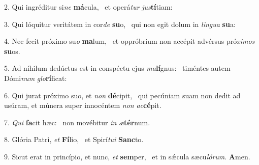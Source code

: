 2. Qui ingréditur si\textit{ne} \textbf{má}cula, \ast\  et operá\textit{tur} \textit{jus}\textbf{tí}tiam:\

3. Qui lóquitur veritátem in cor\textit{de} \textbf{su}o, \ast\  qui non egit dolum in \textit{lin}\textit{gua} \textbf{su}a:\

4. Nec fecit próximo su\textit{o} \textbf{ma}lum, \ast\  et oppróbrium non accépit advérsus pró\textit{xi}\textit{mos} \textbf{su}os.\

5. Ad níhilum dedúctus est in conspéctu ejus \textit{ma}\textbf{lí}gnus: \ast\  timéntes autem Dómi\textit{num} \textit{glo}\textbf{rí}ficat:\

6. Qui jurat próximo suo, et \textit{non} \textbf{dé}cipit, \ast\  qui pecúniam suam non dedit ad usúram, et múnera super innocéntem \textit{non} \textit{ac}\textbf{cé}pit.\

7. \textit{Qui} \textbf{fa}cit hæc: \ast\  non movébitur \textit{in} \textit{æ}\textbf{tér}num.\

8. Glória Patri, \textit{et} \textbf{Fí}lio, \ast\  et Spirí\textit{tu}\textit{i} \textbf{Sanc}to.\

9. Sicut erat in princípio, et nunc, \textit{et} \textbf{sem}per, \ast\  et in sǽcula sæcu\textit{ló}\textit{rum}. \textbf{A}men.\

